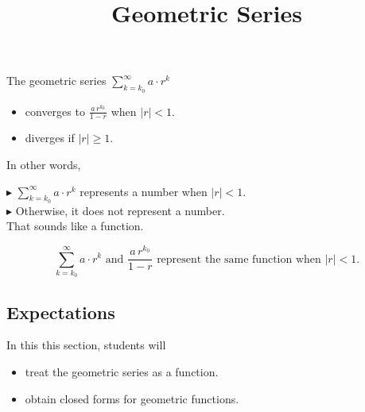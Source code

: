 \documentclass{ximera}
\title{Geometric Series}
\begin{document}
\begin{abstract}
\end{abstract}
\maketitle







\begin{theorem}
The geometric series $\sum\limits_{k= k_0}^\infty a \cdot r^k$ 
  
  \begin{itemize} 
  \item converges to $\frac{a \, r^{k_0}}{1-r}$ when $|r| < 1$.
  \item diverges if $|r| \geq 1$.  
  \end{itemize}
\end{theorem}




In other words, 


$\blacktriangleright$  $\sum\limits_{k= k_0}^\infty a \cdot r^k$ represents a number when $|r| < 1$. \\

$\blacktriangleright$ Otherwise, it does not represent a number. \\





That sounds like a function.



\[
\sum\limits_{k= k_0}^\infty a \cdot r^k  \text{ and } \frac{a \, r^{k_0}}{1-r} \text{ represent the same function when } |r| < 1.
\]





\subsection{Expectations}

\begin{sectionOutcomes}
In this this section, students will  

\begin{itemize}
\item treat the geometric series as a function.
\item obtain closed forms for geometric functions.
\end{itemize}
\end{sectionOutcomes}
\end{document}
